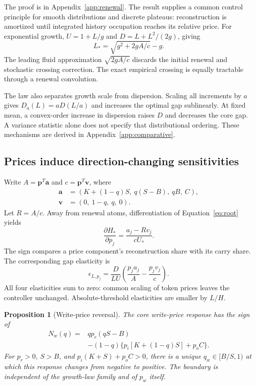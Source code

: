\documentclass[sigconf,screen,nonacm]{acmart}
\newcommand{\pp}{\boldsymbol{p}}
\newcommand{\avec}{\boldsymbol{a}}
\newcommand{\Vvec}{\boldsymbol{v}}
\newtheorem{claim}[result]{Proposition}
\begin{document}
The proof is in Appendix~\ref{app:renewal}. The result supplies a common
control principle for smooth distributions and discrete plateaus: reconstruction
is amortized until integrated history occupation reaches its relative price.
For exponential growth, $U=1+L/g$ and $D=L+L^2/(2g)$, giving
\begin{equation}
L_*=\sqrt{g^2+2gA/c}-g.
\label{eq:exponential}
\end{equation}
The leading fluid approximation $\sqrt{2gA/c}$ discards the initial renewal
and stochastic crossing correction. The exact empirical crossing is equally
tractable through a renewal convolution.

The law also separates growth scale from dispersion. Scaling all increments
by $a$ gives $D_a(L)=aD(L/a)$ and increases the optimal gap sublinearly. At
fixed mean, a convex-order increase in dispersion raises $D$ and decreases
the core gap. A variance statistic alone does not specify that distributional
ordering. These mechanisms are derived in Appendix~\ref{app:comparative}.

\subsection{Prices induce direction-changing sensitivities}
\label{sec:prices}

Write $A=\pp^T\avec$ and $c=\pp^T\Vvec$, where
\begin{equation}
\begin{split}
\avec&=(K+(1-q)S,\ q(S-B),\ qB,\ C),\\
\Vvec&=(0,\ 1-q,\ q,\ 0).
\end{split}
\end{equation}
Let $R=A/c$. Away from renewal atoms, differentiation of
Equation~\eqref{eq:root} yields
\begin{equation}
\boxed{\frac{\partial H_*}{\partial p_j}
 =\frac{a_j-Rv_j}{cU_*}.}
\label{eq:pricegradient}
\end{equation}
The sign compares a price component's reconstruction share with its carry
share. The corresponding gap elasticity is
\begin{equation}
\epsilon_{L,p_j}=\frac{D}{LU}
\left(\frac{p_ja_j}{A}-\frac{p_jv_j}{c}\right).
\label{eq:elasticity}
\end{equation}
All four elasticities sum to zero: common scaling of token prices leaves the
controller unchanged. Absolute-threshold elasticities are smaller by $L/H$.

\begin{claim}[Write-price reversal]
\label{prop:write}
The core write-price response has the sign of
\begin{equation}
\begin{split}
N_w(q)={}&qp_r(qS-B)\\
&-(1-q)\{p_i[K+(1-q)S]+p_oC\}.
\end{split}
\label{eq:writephase}
\end{equation}
For $p_r>0$, $S>B$, and $p_i(K+S)+p_oC>0$, there is a unique
$q_w\in[B/S,1)$ at which this response changes from negative to positive.
The boundary is independent of the growth-law family and of $p_w$ itself.
\end{claim}
\end{document}

